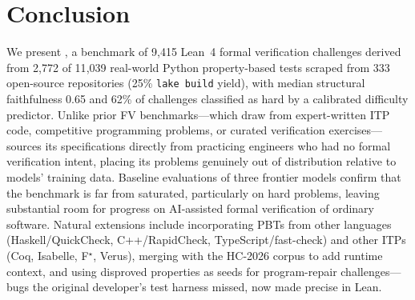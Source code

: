 \section{Conclusion}
We present \FVSpec, a benchmark of 9{,}415 Lean~4 formal verification challenges derived from 2{,}772 of 11{,}039 real-world Python property-based tests scraped from 333 open-source repositories (25\% \texttt{lake build} yield), with median structural faithfulness 0.65 and 62\% of challenges classified as hard by a calibrated difficulty predictor. Unlike prior FV benchmarks---which draw from expert-written ITP code, competitive programming problems, or curated verification exercises---\FVSpec sources its specifications directly from practicing engineers who had no formal verification intent, placing its problems genuinely out of distribution relative to models' training data. Baseline evaluations of three frontier models confirm that the benchmark is far from saturated, particularly on hard problems, leaving substantial room for progress on AI-assisted formal verification of ordinary software. Natural extensions include incorporating PBTs from other languages (Haskell/QuickCheck, C++/RapidCheck, TypeScript/fast-check) and other ITPs (Coq, Isabelle, F$^\star$, Verus), merging with the HC-2026 corpus to add runtime context, and using disproved properties as seeds for program-repair challenges---bugs the original developer's test harness missed, now made precise in Lean.

